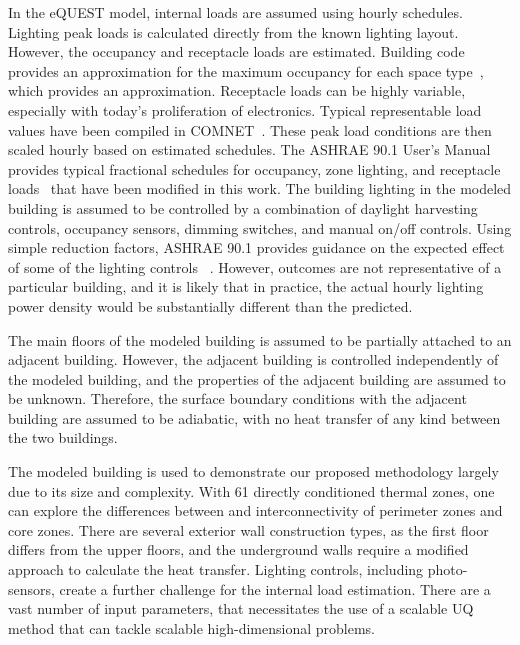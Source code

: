 In the eQUEST model, internal loads are assumed using hourly schedules. Lighting peak loads is calculated directly from the known lighting layout. However, the occupancy and receptacle loads are estimated.  Building code provides an approximation for the maximum occupancy for each space type~\citep{council2015international}, which provides an approximation.  Receptacle loads can be highly variable, especially with today’s proliferation of electronics. Typical representable load values have been compiled in COMNET~\citep{resnet2010}.  These peak load conditions are then scaled hourly based on estimated schedules.  The ASHRAE 90.1 User’s Manual provides typical fractional schedules for occupancy, zone lighting, and receptacle loads~\citep{americanenergy} that have been modified in this work. The building lighting in the modeled building is assumed to be  controlled by a combination of daylight harvesting controls, occupancy sensors, dimming switches, and manual on/off controls.  Using simple reduction factors, ASHRAE 90.1 provides guidance on the expected effect of some of the lighting controls ~\citep{american90}.  However, outcomes are not representative of a particular building, and it is likely that in practice, the actual hourly lighting power density would be substantially different than the predicted. 

The main floors of the modeled building is assumed to be partially attached to an adjacent building.  However, the adjacent building is controlled independently of the modeled building, and the properties of the adjacent building are assumed to be unknown. Therefore, the surface boundary conditions with the adjacent building are assumed to be adiabatic, with no heat transfer of any kind between the two buildings.  

The modeled building is used to demonstrate our proposed methodology largely due to its size and complexity.  With 61 directly conditioned thermal zones, one can explore the differences between and interconnectivity of perimeter zones and core zones.  There are several exterior wall construction types, as the first floor differs from the upper floors, and the underground walls require a modified approach to calculate the heat transfer.  Lighting controls, including photo-sensors, create a further challenge for the internal load estimation.  There are a vast number of input parameters, that necessitates the use of a scalable UQ method that can tackle scalable high-dimensional problems.




